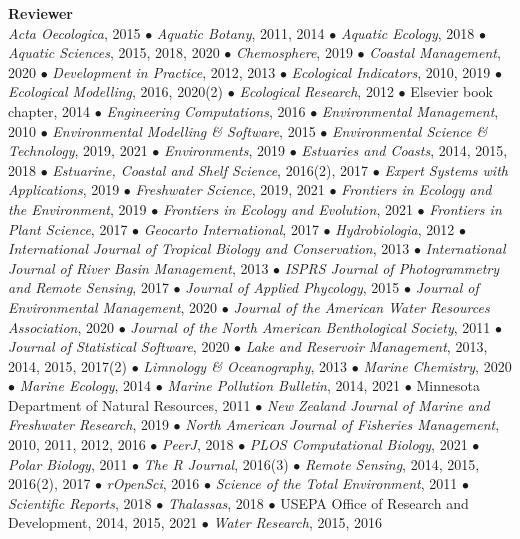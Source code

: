 \documentclass[letterpaper,12pt]{article}
\begin{document}
{\bf Reviewer}\hfill \\
\textit{Acta Oecologica}, 2015 $\bullet$ \textit{Aquatic Botany}, 2011, 2014 $\bullet$ \textit{Aquatic Ecology}, 2018 $\bullet$ \textit{Aquatic Sciences}, 2015, 2018, 2020 $\bullet$ \textit{Chemosphere}, 2019 $\bullet$ \textit{Coastal Management}, 2020 $\bullet$ \textit{Development in Practice}, 2012, 2013 $\bullet$ \textit{Ecological Indicators}, 2010, 2019 $\bullet$ \textit{Ecological Modelling}, 2016, 2020(2) $\bullet$ \textit{Ecological Research}, 2012 $\bullet$ Elsevier book chapter, 2014 $\bullet$ \textit{Engineering Computations}, 2016 $\bullet$ \textit{Environmental Management}, 2010 $\bullet$ \textit{Environmental Modelling \& Software}, 2015 $\bullet$ \textit{Environmental Science \& Technology}, 2019, 2021 $\bullet$ \textit{Environments}, 2019 $\bullet$ \textit{Estuaries and Coasts}, 2014, 2015, 2018 $\bullet$ \textit{Estuarine, Coastal and Shelf Science}, 2016(2), 2017 $\bullet$ \textit{Expert Systems with Applications}, 2019 $\bullet$ \textit{Freshwater Science}, 2019, 2021 $\bullet$ \textit{Frontiers in Ecology and the Environment}, 2019 $\bullet$ \textit{Frontiers in Ecology and Evolution}, 2021 $\bullet$ \textit{Frontiers in Plant Science}, 2017 $\bullet$ \textit{Geocarto International}, 2017 $\bullet$ \textit{Hydrobiologia}, 2012 $\bullet$ \textit{International Journal of Tropical Biology and Conservation}, 2013 $\bullet$ \textit{International Journal of River Basin Management}, 2013 $\bullet$ \textit{ISPRS Journal of Photogrammetry and Remote Sensing}, 2017 $\bullet$ \textit{Journal of Applied Phycology}, 2015 $\bullet$ \textit{Journal of Environmental Management}, 2020 $\bullet$ \textit{Journal of the American Water Resources Association}, 2020 $\bullet$ \textit{Journal of the North American Benthological Society}, 2011 $\bullet$ \textit{Journal of Statistical Software}, 2020 $\bullet$ \textit{Lake and Reservoir Management}, 2013, 2014, 2015, 2017(2) $\bullet$ \textit{Limnology \& Oceanography}, 2013 $\bullet$ \textit{Marine Chemistry}, 2020 $\bullet$ \textit{Marine Ecology}, 2014 $\bullet$ \textit{Marine Pollution Bulletin}, 2014, 2021 $\bullet$ Minnesota Department of Natural Resources, 2011 $\bullet$ \textit{New Zealand Journal of Marine and Freshwater Research}, 2019 $\bullet$ \textit{North American Journal of Fisheries Management}, 2010, 2011, 2012, 2016 $\bullet$ \textit{PeerJ}, 2018 $\bullet$ \textit{PLOS Computational Biology}, 2021 $\bullet$ \textit{Polar Biology}, 2011 $\bullet$ \textit{The R Journal}, 2016(3) $\bullet$ \textit{Remote Sensing}, 2014, 2015, 2016(2), 2017 $\bullet$ \textit{rOpenSci}, 2016 $\bullet$ \textit{Science of the Total Environment}, 2011 $\bullet$ \textit{Scientific Reports}, 2018 $\bullet$ \textit{Thalassas}, 2018 $\bullet$ USEPA Office of Research and Development, 2014, 2015, 2021 $\bullet$ \textit{Water Research}, 2015, 2016
\end{document}
